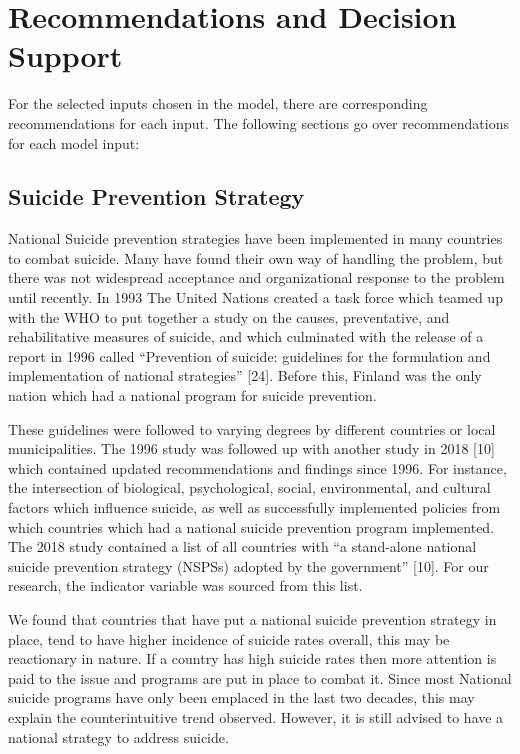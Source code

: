 \documentclass[]{article}
\begin{document}
\section{Recommendations and Decision
Support}\label{recommendations-and-decision-support}

For the selected inputs chosen in the model, there are corresponding
recommendations for each input. The following sections go over
recommendations for each model input:

\subsection{Suicide Prevention
Strategy}\label{suicide-prevention-strategy}

National Suicide prevention strategies have been implemented in many
countries to combat suicide. Many have found their own way of handling
the problem, but there was not widespread acceptance and organizational
response to the problem until recently. In 1993 The United Nations
created a task force which teamed up with the WHO to put together a
study on the causes, preventative, and rehabilitative measures of
suicide, and which culminated with the release of a report in 1996
called ``Prevention of suicide: guidelines for the formulation and
implementation of national strategies'' {[}24{]}. Before this, Finland
was the only nation which had a national program for suicide prevention.

These guidelines were followed to varying degrees by different countries
or local municipalities. The 1996 study was followed up with another
study in 2018 {[}10{]} which contained updated recommendations and
findings since 1996. For instance, the intersection of biological,
psychological, social, environmental, and cultural factors which
influence suicide, as well as successfully implemented policies from
which countries which had a national suicide prevention program
implemented. The 2018 study contained a list of all countries with ``a
stand-alone national suicide prevention strategy (NSPSs) adopted by the
government'' {[}10{]}. For our research, the indicator variable was
sourced from this list.

We found that countries that have put a national suicide prevention
strategy in place, tend to have higher incidence of suicide rates
overall, this may be reactionary in nature. If a country has high
suicide rates then more attention is paid to the issue and programs are
put in place to combat it. Since most National suicide programs have
only been emplaced in the last two decades, this may explain the
counterintuitive trend observed. However, it is still advised to have a
national strategy to address suicide.
\end{document}
